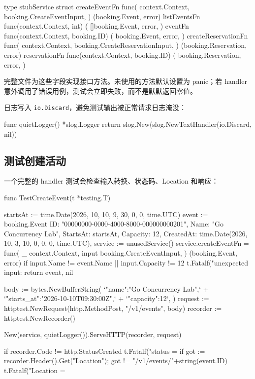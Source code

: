 \begin{gocode}[title={代码清单 12.33 \texttt{server\_test.go}：HTTP 服务 stub}]
type stubService struct {
    createEventFn func(
        context.Context,
        booking.CreateEventInput,
    ) (booking.Event, error)
    listEventsFn func(context.Context, int) (
        []booking.Event, error,
    )
    eventFn func(context.Context, booking.ID) (
        booking.Event, error,
    )
    createReservationFn func(
        context.Context,
        booking.CreateReservationInput,
    ) (booking.Reservation, error)
    reservationFn func(context.Context, booking.ID) (
        booking.Reservation, error,
    )
}
\end{gocode}

完整文件为这些字段实现接口方法。未使用的方法默认设置为 panic；若 handler 意外调用了错误用例，测试会立即失败，而不是默默返回零值。

日志写入 \texttt{io.Discard}，避免测试输出被正常请求日志淹没：

\begin{gocode}[]
func quietLogger() *slog.Logger {
    return slog.New(slog.NewTextHandler(io.Discard, nil))
}
\end{gocode}

\subsection{测试创建活动}

一个完整的 handler 测试会检查输入转换、状态码、Location 和响应：

\begin{gocode}[title={代码清单 12.34 \texttt{server\_test.go}：测试创建活动端点}]
func TestCreateEvent(t *testing.T) {
    startsAt := time.Date(2026, 10, 10, 9, 30, 0, 0, time.UTC)
    event := booking.Event{
        ID: "00000000-0000-4000-8000-000000000201",
        Name: "Go Concurrency Lab",
        StartsAt: startsAt, Capacity: 12,
        CreatedAt: time.Date(2026, 10, 3, 10, 0, 0, 0, time.UTC),
    }
    service := unusedService()
    service.createEventFn = func(
        _ context.Context,
        input booking.CreateEventInput,
    ) (booking.Event, error) {
        if input.Name != event.Name || input.Capacity != 12 {
            t.Fatalf("unexpected input: %
        }
        return event, nil
    }

    body := bytes.NewBufferString(
        `{"name":"Go Concurrency Lab",` +
            `"starts_at":"2026-10-10T09:30:00Z",` +
            `"capacity":12}`,
    )
    request := httptest.NewRequest(http.MethodPost,
        "/v1/events", body)
    recorder := httptest.NewRecorder()

    New(service, quietLogger()).ServeHTTP(recorder, request)

    if recorder.Code != http.StatusCreated {
        t.Fatalf("status = %
    }
    if got := recorder.Header().Get("Location");
        got != "/v1/events/"+string(event.ID) {
        t.Fatalf("Location = %
    }
}
\end{gocode}

